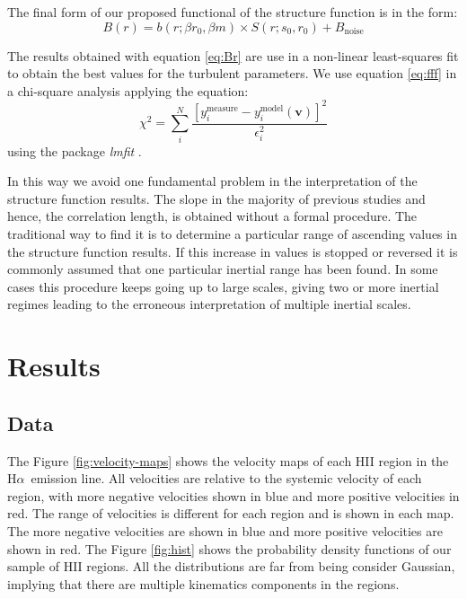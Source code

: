 \documentclass[fleqn,usenatbib, useAMS, a4paper]{mnras}
\newcommand\halpha{H${\alpha}$}
\begin{document}
The final form of our proposed functional of the structure function is in the form:
%
\begin{equation}\label{eq:fff}
B(r) = b(r; \beta r_0, \beta m) \times S(r; s_0, r_0) + B_{\text{noise}}
\end{equation}

The results obtained with equation \ref{eq:Br} are use in a non-linear least-squares
fit to obtain the best values for the turbulent parameters. 
We use equation \ref{eq:fff} in a chi-square analysis applying the equation:
%
\begin{equation}\label{eq:chi}
  \chi^2 = \sum_i ^N \frac{[y_i^{\text{measure}}-y_i^{\text{model}} (\boldsymbol{v})]^2}{\epsilon_i ^2}
\end{equation}
%
using the package \textit{lmfit} \citep{newville_matthew_2014_11813}. 

In this way we avoid one fundamental problem in the interpretation of the structure function results. 
The slope in the majority of previous studies and hence, the correlation length, is obtained without a formal procedure. 
The traditional way to find it is to determine a particular range of ascending values in the structure function results. 
If this increase in values is stopped or reversed it is commonly assumed that one particular inertial range has been found. 
In some cases this procedure keeps going up to large scales, giving two or more inertial regimes leading to the erroneous interpretation of multiple inertial scales.


\section{Results}\label{sec:results}

\subsection{Data}

The Figure \ref{fig:velocity-maps} shows the velocity maps of each HII region in the \halpha\ emission line.
All velocities are relative to the systemic velocity of each region, with more negative velocities shown in blue and more positive velocities in red. The range of velocities is different for each region and is shown in each map. The more negative velocities are shown in blue and more positive velocities are shown in red.
The Figure \ref{fig:hist} shows the probability density functions of our sample of HII regions.
All the distributions are far from being consider Gaussian, implying that there are multiple kinematics components in the regions.
\end{document}
